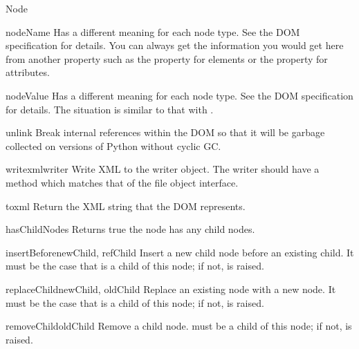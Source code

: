 \begin{classdesc}{Node}{}
\begin{memberdesc}{nodeName}
Has a different meaning for each node type.  See the DOM specification
for details.  You can always get the information you would get here
from another property such as the  property for
elements or the  property for attributes.
\end{memberdesc}

\begin{memberdesc}{nodeValue}
Has a different meaning for each node type.  See the DOM specification
for details.  The situation is similar to that with .
\end{memberdesc}

\begin{methoddesc}{unlink}{}
Break internal references within the DOM so that it will be garbage
collected on versions of Python without cyclic GC.
\end{methoddesc}

\begin{methoddesc}{writexml}{writer}
Write XML to the writer object.  The writer should have a
 method which matches that of the file object
interface.
\end{methoddesc}

\begin{methoddesc}{toxml}{}
Return the XML string that the DOM represents.
\end{methoddesc}

\begin{methoddesc}{hasChildNodes}{}
Returns true the node has any child nodes.
\end{methoddesc}

\begin{methoddesc}{insertBefore}{newChild, refChild}
Insert a new child node before an existing child.  It must be the case
that  is a child of this node; if not,
 is raised.
\end{methoddesc}

\begin{methoddesc}{replaceChild}{newChild, oldChild}
Replace an existing node with a new node. It must be the case that 
 is a child of this node; if not,
 is raised.
\end{methoddesc}

\begin{methoddesc}{removeChild}{oldChild}
Remove a child node.   must be a child of this node; if
not,  is raised.
\end{methoddesc}


\end{classdesc}
